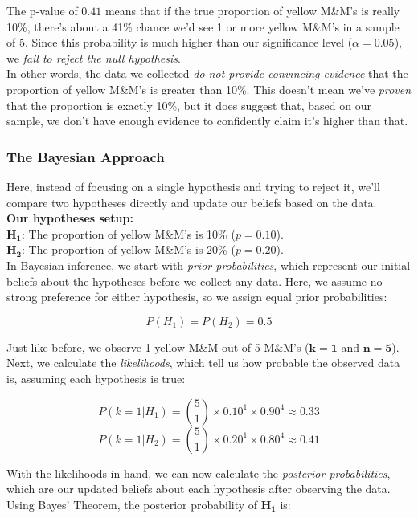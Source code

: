 The p-value of \(\mathbf{0.41}\) means that if the true proportion of yellow M\&M’s is really 10\%, there’s about a 41\% chance we’d see 1 or more yellow M\&M’s in a sample of 5. Since this probability is much higher than our significance level (\(\alpha = 0.05\)), we \textit{fail to reject the null hypothesis}.\\

In other words, the data we collected \textit{do not provide convincing evidence} that the proportion of yellow M\&M’s is greater than 10\%. This doesn’t mean we’ve \textit{proven} that the proportion is exactly 10\%, but it does suggest that, based on our sample, we don’t have enough evidence to confidently claim it’s higher than that.

\subsubsection{The Bayesian Approach}

Here, instead of focusing on a single hypothesis and trying to reject it, we’ll compare two hypotheses directly and update our beliefs based on the data.\\

\textbf{Our hypotheses setup:}\\

\(\mathbf{H_1}\): The proportion of yellow M\&M’s is 10\% (\(p = 0.10\)).\\
\(\mathbf{H_2}\): The proportion of yellow M\&M’s is 20\% (\(p = 0.20\)).\\

In Bayesian inference, we start with \textit{prior probabilities}, which represent our initial beliefs about the hypotheses before we collect any data. Here, we assume no strong preference for either hypothesis, so we assign equal prior probabilities:

\[
P(H_1) = P(H_2) = 0.5
\]

Just like before, we observe 1 yellow M\&M out of 5 M\&M’s (\(\mathbf{k = 1}\) and \(\mathbf{n = 5}\)). Next, we calculate the \textit{likelihoods}, which tell us how probable the observed data is, assuming each hypothesis is true:

\[
P(k = 1 | H_1) = \binom{5}{1} \times 0.10^1 \times 0.90^4 \approx 0.33
\]
\[
P(k = 1 | H_2) = \binom{5}{1} \times 0.20^1 \times 0.80^4 \approx 0.41
\]

With the likelihoods in hand, we can now calculate the \textit{posterior probabilities}, which are our updated beliefs about each hypothesis after observing the data. Using Bayes’ Theorem, the posterior probability of \(\mathbf{H_1}\) is:

